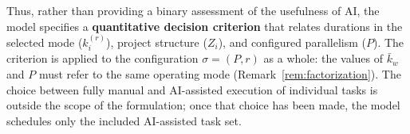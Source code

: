 \begin{remark}
Thus, rather than providing a binary assessment of the usefulness of AI, the model specifies a \textbf{quantitative decision criterion} that relates durations in the selected mode ($k_i^{(r)}$), project structure ($Z_i$), and configured parallelism ($P$). The criterion is applied to the configuration $\sigma = (P, r)$ as a whole: the values of $\bar{k}_w$ and $P$ must refer to the same operating mode (Remark~\ref{rem:factorization}). The choice between fully manual and AI-assisted execution of individual tasks is outside the scope of the formulation; once that choice has been made, the model schedules only the included AI-assisted task set.
\end{remark}
